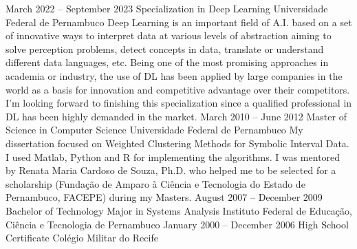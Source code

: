 \cvmetaevent
{March 2022 – September 2023}
{Specialization in Deep Learning}
{Universidade Federal de Pernambuco}
{Deep Learning is an important field of A.I. based on a set of innovative ways to interpret data at various levels of abstraction aiming to solve perception problems, detect concepts in data, translate or understand different data languages, etc. Being one of the most promising approaches in academia or industry, the use of DL has been applied by large companies in the world as a basis for innovation and competitive advantage over their competitors. I'm looking forward to finishing this specialization since a qualified professional in DL has been highly demanded in the market.}
\cvmetaevent
{March 2010 – June 2012}
{Master of Science in Computer Science}
{Universidade Federal de Pernambuco}
{My dissertation focused on Weighted Clustering Methods for Symbolic Interval Data. I  used Matlab, Python and R for implementing the algorithms. I was mentored by Renata Maria Cardoso de Souza, Ph.D.  who helped me to be selected for a scholarship (Fundação de Amparo à Ciência e Tecnologia do Estado de Pernambuco, FACEPE) during my Masters.}
\cvmetaevent
{August 2007 – December 2009}
{Bachelor of Technology Major in Systems Analysis}
{Instituto Federal de Educação, Ciência e Tecnologia de Pernambuco}
{}
\cvmetaevent
{January 2000 – December 2006}
{High School Certificate}
{Colégio Militar do Recife}
{}
